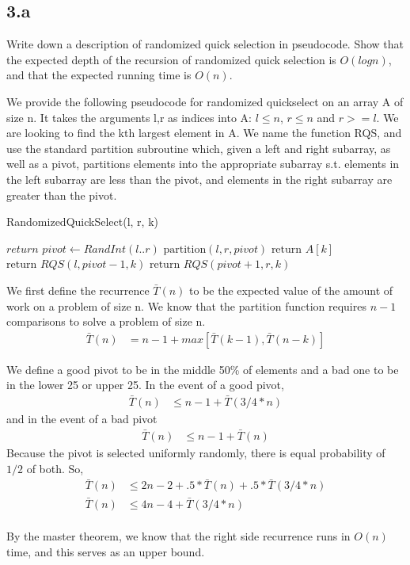 \documentclass[11pt]{article}
\begin{document}



\subsection *{3.a}
Write down a description of randomized quick selection in pseudocode. Show that the expected depth of the recursion of randomized quick selection is $O(log n)$, and that the
expected running time is $O(n)$.

\begin{solution}

We provide the following pseudocode for randomized quickselect on an array A of size n. It takes the arguments l,r as indices into A: $l \leq n$, $r \leq n$ and $r >= l$. We are looking to find the kth largest element in A. We name the function RQS, and use the standard partition subroutine which, given a left and right subarray, as well as a pivot, partitions elements into the appropriate subarray s.t. elements in the left subarray are less than the pivot, and elements in the right subarray are greater than the pivot.
\begin{algorithm}
\caption{RandomizedQuickSelect(l, r, k)}
\begin{algorithmic}
\STATE $return$
\ENDIF
\STATE $pivot \gets RandInt(l..r)$
\STATE $\text{partition}(l,r,pivot)$
\STATE $\text{return } A[k]$
\STATE $\text{return } RQS(l, pivot - 1, k)$
\ELSE 
\STATE $\text{return } RQS(pivot+1, r, k)$
\ENDIF
\end{algorithmic}
\end{algorithm} 

We first define the recurrence $\bar{T}(n)$ to be the expected value of the amount of work on a problem of size n. We know that the partition function requires $n-1$ comparisons to solve a problem of size n.
\begin{align*}
\bar{T}(n) &= n - 1 + max[\bar{T}(k-1), \bar{T}(n-k)]
\end{align*}

We define a good pivot to be in the middle 50\% of elements and a bad one to be in the lower 25 or upper 25.  In the event of a good pivot,
\begin{align*}
\bar{T}(n) &\leq n - 1 + \bar{T}(3/4 * n)
\end{align*}
and in the event of a bad pivot
\begin{align*}
\bar{T}(n) &\leq n - 1 + \bar{T}(n)
\end{align*}
Because the pivot is selected uniformly randomly, there is equal probability of $1/2$ of both. So,
\begin{align*}
\bar{T}(n) &\leq 2n - 2 + .5*\bar{T}(n) + .5*\bar{T}(3/4 * n) \\
\bar{T}(n) &\leq 4n - 4 + \bar{T}(3/4 * n)
\end{align*}
\\ By the master theorem, we know that the right side recurrence runs in $O(n)$ time, and this serves as an upper bound.
\\


\end{solution}
\end{document}
